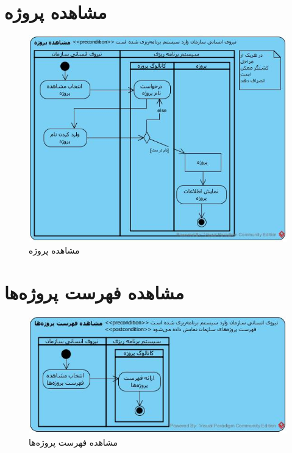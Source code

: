 \section{مشاهده پروژه}
\begin{figure}[H]
	\centering
	\includegraphics[scale=0.8]{img/activity/ViewProject}
	\caption{مشاهده پروژه}
\end{figure}


\section{مشاهده فهرست پروژه‌ها}
\begin{figure}[H]
	\centering
	\includegraphics[scale=0.8]{img/activity/ViewListOfProjects}
	\caption{مشاهده فهرست پروژه‌ها}
\end{figure}


